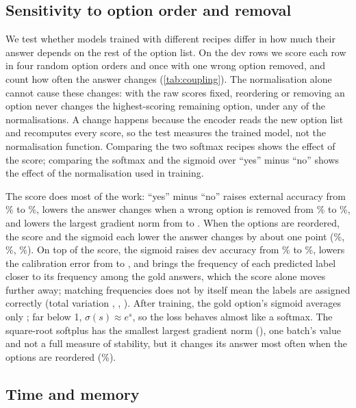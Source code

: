 \subsection{Sensitivity to option order and removal}
\label{sec:coupling}

We test whether models trained with different recipes differ in how much their answer depends on the rest of the option list.
On the dev rows we score each row in four random option orders and once with one wrong option removed, and count how often the answer changes (\cref{tab:coupling}).
The normalisation alone cannot cause these changes: with the raw scores fixed, reordering or removing an option never changes the highest-scoring remaining option, under any of the normalisations.
A change happens because the encoder reads the new option list and recomputes every score, so the test measures the trained model, not the normalisation function.
Comparing the two softmax recipes shows the effect of the score; comparing the softmax and the sigmoid over ``yes'' minus ``no'' shows the effect of the normalisation used in training.

The score does most of the work: ``yes'' minus ``no'' raises external accuracy from \CpExtYes{}\% to \CpExtYesNo{}\%, lowers the answer changes when a wrong option is removed from \CpDropYes{}\% to \CpDropYesNo{}\%, and lowers the largest gradient norm from \CpGradYes{} to \CpGradYesNo{}.
When the options are reordered, the score and the sigmoid each lower the answer changes by about one point (\CpShufYes{}\%, \CpShufYesNo{}\%, \CpShufSig{}\%).
On top of the score, the sigmoid raises dev accuracy from \CpAccYesNo{}\% to \CpAccSig{}\%, lowers the calibration error from \CpEceYesNo{} to \CpEceSig{}, and brings the frequency of each predicted label closer to its frequency among the gold answers, which the score alone moves further away; matching frequencies does not by itself mean the labels are assigned correctly (total variation \CpLabelYes{}, \CpLabelYesNo{}, \CpLabelSig{}).
After training, the gold option's sigmoid averages only \CpSigGoldSig{}; far below 1, $\sigma(s)\approx e^{s}$, so the loss behaves almost like a softmax.
The square-root softplus has the smallest largest gradient norm (\CpGradSqrt{}), one batch's value and not a full measure of stability, but it changes its answer most often when the options are reordered (\CpShufSqrt{}\%).

\subsection{Time and memory}
\label{sec:cost}

